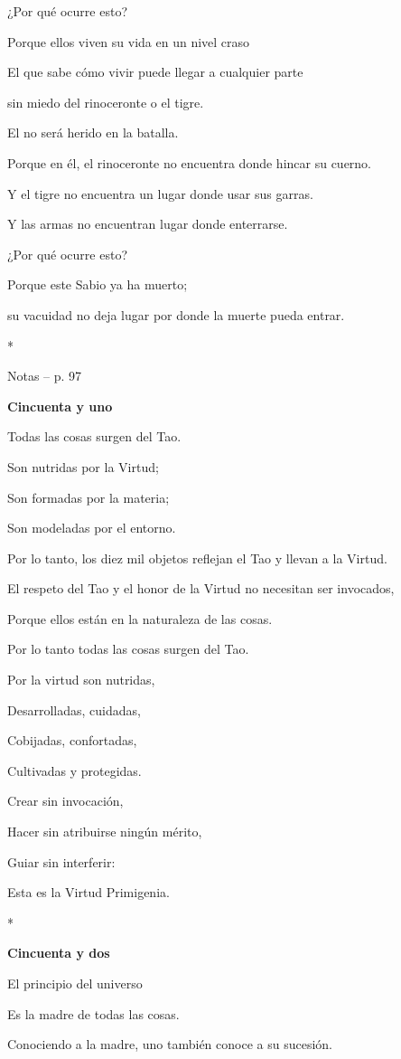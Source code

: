 ¿Por qué ocurre esto?

Porque ellos viven su vida en un nivel craso

El que sabe cómo vivir puede llegar a cualquier parte

sin miedo del rinoceronte o el tigre.

El no será herido en la batalla.

Porque en él, el rinoceronte no encuentra donde hincar su cuerno.

Y el tigre no encuentra un lugar donde usar sus garras.

Y las armas no encuentran lugar donde enterrarse.

¿Por qué ocurre esto?

Porque este Sabio ya ha muerto;

su vacuidad no deja lugar por donde la muerte pueda entrar.

*

Notas -- p. 97

\textbf{Cincuenta y uno}

Todas las cosas surgen del Tao.

Son nutridas por la Virtud;

Son formadas por la materia;

Son modeladas por el entorno.

Por lo tanto, los diez mil objetos reflejan el Tao y llevan a la Virtud.

El respeto del Tao y el honor de la Virtud no necesitan ser invocados,

Porque ellos están en la naturaleza de las cosas.

Por lo tanto todas las cosas surgen del Tao.

Por la virtud son nutridas,

Desarrolladas, cuidadas,

Cobijadas, confortadas,

Cultivadas y protegidas.

Crear sin invocación,

Hacer sin atribuirse ningún mérito,

Guiar sin interferir:

Esta es la Virtud Primigenia.

*

\textbf{Cincuenta y dos}

El principio del universo

Es la madre de todas las cosas.

Conociendo a la madre, uno también conoce a su sucesión.


